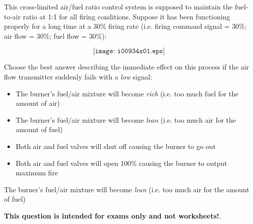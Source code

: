 

This cross-limited air/fuel ratio control system is supposed to maintain the fuel-to-air ratio at 1:1 for all firing conditions.  Suppose it has been functioning properly for a long time at a 30\% firing rate (i.e. firing command signal = 30\%; air flow = 30\%; fuel flow = 30\%):

$$\texttt{[image: i00934x01.eps]}$$

\noindent
Choose the best answer describing the immediate effect on this process if the air flow transmitter suddenly fails with a {\it low} signal:

\begin{itemize}
\item{} The burner's fuel/air mixture will become {\it rich} (i.e. too much fuel for the amount of air)
\vskip 10pt
\item{} The burner's fuel/air mixture will become {\it lean} (i.e. too much air for the amount of fuel)
\vskip 10pt
\item{} Both air and fuel valves will shut off causing the burner to go out
\vskip 10pt
\item{} Both air and fuel valves will open 100\% causing the burner to output maximum fire
\end{itemize}







The burner's fuel/air mixture will become {\it lean} (i.e. too much air for the amount of fuel)







{\bf This question is intended for exams only and not worksheets!}.



